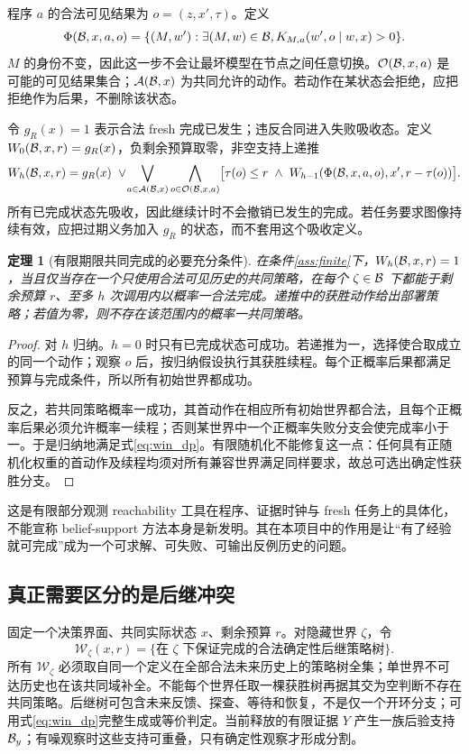 \documentclass[11pt,a4paper,fontset=fandol]{ctexart}
\newtheorem{theorem}{定理}[section]
\theoremstyle{definition}
\theoremstyle{remark}\newtheorem{remark}[theorem]{说明}
\numberwithin{equation}{section}
\newcommand{\cA}{\mathcal A}\newcommand{\cQ}{\mathcal Q}\newcommand{\cF}{\mathcal F}
\begin{document}
程序 $a$ 的合法可见结果为 $o=(z,x',\tau)$。定义
\begin{equation}
 \Phi(\mathcal B,x,a,o)=\{(M,w'):\exists(M,w)\in\mathcal B,
 K_{M,a}(w',o\mid w,x)>0\}.
 \label{eq:phi}
\end{equation}
$M$ 的身份不变，因此这一步不会让最坏模型在节点之间任意切换。$\mathcal O(\mathcal B,x,a)$ 是可能的可见结果集合；$\cA(\cB,x)$ 为共同允许的动作。若动作在某状态会拒绝，应把拒绝作为后果，不删除该状态。

令 $g_R(x)=1$ 表示合法 fresh 完成已发生；违反合同进入失败吸收态。定义 $W_0(\mathcal B,x,r)=g_R(x)$，负剩余预算取零，非空支持上递推
\begin{align}
 W_h(\cB,x,r)=g_R(x)\ \vee\!
 \bigvee_{a\in\cA(\cB,x)}
 \bigwedge_{o\in\mathcal O(\cB,x,a)}
 \bigl[\tau(o)\le r\ \wedge\ W_{h-1}(\Phi(\cB,x,a,o),x',r-\tau(o))\bigr].
 \label{eq:win_dp}
\end{align}
所有已完成状态先吸收，因此继续计时不会撤销已发生的完成。若任务要求图像持续有效，应把过期义务加入 $g_R$ 的状态，而不套用这个吸收定义。

\begin{theorem}[有限期限共同完成的必要充分条件]
\label{thm:win}
在条件\ref{ass:finite}下，$W_h(\mathcal B,x,r)=1$，当且仅当存在一个只使用合法可见历史的共同策略，在每个 $\zeta\in\mathcal B$ 下都能于剩余预算 $r$、至多 $h$ 次调用内以概率一合法完成。递推中的获胜动作给出部署策略；若值为零，则不存在该范围内的概率一共同策略。
\end{theorem}
\begin{proof}
对 $h$ 归纳。$h=0$ 时只有已完成状态可成功。若递推为一，选择使合取成立的同一个动作；观察 $o$ 后，按归纳假设执行其获胜续程。每个正概率后果都满足预算与完成条件，所以所有初始世界都成功。

反之，若共同策略概率一成功，其首动作在相应所有初始世界都合法，且每个正概率后果必须允许概率一续程；否则某世界中一个正概率失败分支会使完成率小于一。于是归纳地满足式\eqref{eq:win_dp}。有限随机化不能修复这一点：任何具有正随机化权重的首动作及续程均须对所有兼容世界满足同样要求，故总可选出确定性获胜分支。
\end{proof}

这是有限部分观测 reachability 工具在程序、证据时钟与 fresh 任务上的具体化，不能宣称 belief-support 方法本身是新发明\cite{qualitative}。其在本项目中的作用是让“有了经验就可完成”成为一个可求解、可失败、可输出反例历史的问题。

\subsection{真正需要区分的是后继冲突}
固定一个决策界面、共同实际状态 $x$、剩余预算 $r$。对隐藏世界 $\zeta$，令
\begin{equation}
 \mathcal W_\zeta(x,r)=\{\text{在 }\zeta\text{ 下保证完成的合法确定性后继策略树}\}.
 \label{eq:winning_trees}
\end{equation}
所有 $\mathcal W_\zeta$ 必须取自同一个定义在全部合法未来历史上的策略树全集；单世界不可达历史也在该共同域补全。不能每个世界任取一棵获胜树再据其交为空判断不存在共同策略。后继树可包含未来反馈、探查、等待和恢复，不是仅一个开环分支；可用式\eqref{eq:win_dp}完整生成或等价判定。当前释放的有限证据 $Y$ 产生一族后验支持 $\mathcal B_y$；有噪观察时这些支持可重叠，只有确定性观察才形成分割。
\end{document}

